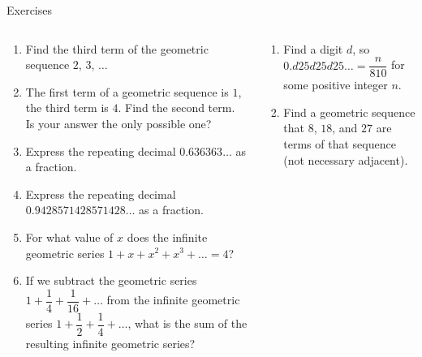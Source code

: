 \documentclass[9pt,aspectratio=169]{beamer}
\begin{document}
\begin{frame}{Exercises}
  \begin{columns}[T]
    \begin{column}{0.5\textwidth}
      \begin{enumerate}
        \item Find the third term of the geometric sequence $2$, $3$, $\ldots$
        \item The first term of a geometric sequence is $1$, the third term is $4$. Find the second term. Is your answer the only possible one?
        \item Express the repeating decimal $0.636363\ldots$ as a fraction.
        \item Express the repeating decimal $0.9428571428571428\ldots$ as a fraction.
        \item For what value of $x$ does the infinite geometric series $1 + x + x^2 + x^3 + \ldots = 4$?
        \item If we subtract the geometric series $1 + \dfrac{1}{4} + \dfrac{1}{16} + \ldots$ from the infinite geometric series $1 + \dfrac{1}{2} + \dfrac{1}{4} + \ldots$, what is the sum of the resulting infinite geometric series?
        \seti
      \end{enumerate}
    \end{column}
    \begin{column}{0.5\textwidth}
      \begin{enumerate}
        \conti
        \item Find a digit $d$, so $0.d25d25d25\ldots = \dfrac{n}{810}$ for some positive integer $n$.
        \item Find a geometric sequence that $8$, $18$, and $27$ are terms of that sequence (not necessary adjacent).
      \end{enumerate}
    \end{column}
  \end{columns}
\end{frame}
\end{document}
